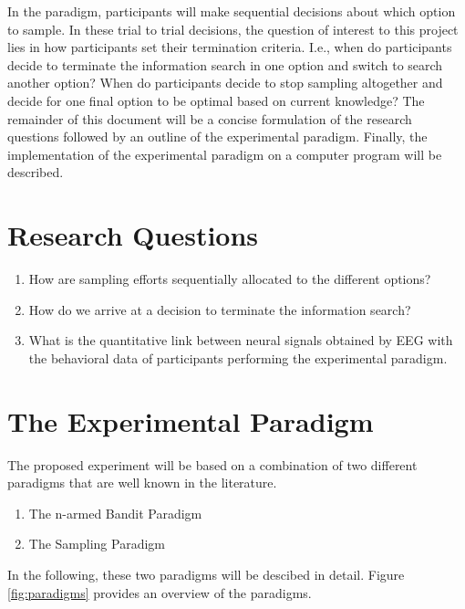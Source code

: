 \documentclass[
	12pt,
	oneside,
	bibliography=totocnumbered]{scrartcl}
\begin{document}
In the paradigm, participants will make sequential decisions about which option to sample. In these trial to trial decisions, the question of interest to this project lies in how participants set their termination criteria. I.e., when do participants decide to terminate the information search in one option and switch to search another option? When do participants decide to stop sampling altogether and decide for one final option to be optimal based on current knowledge? The remainder of this document will be a concise formulation of the research questions followed by an outline of the experimental paradigm. Finally, the implementation of the experimental paradigm on a computer program will be described.


\section{Research Questions}

\begin{enumerate}
\item How are sampling efforts sequentially allocated to the different options?
\item How do we arrive at a decision to terminate the information search?
\item What is the quantitative link between neural signals obtained by EEG with the behavioral data of participants performing the experimental paradigm.
\end{enumerate}



\section{The Experimental Paradigm}
The proposed experiment will be based on a combination  of two different paradigms that are well known in the literature.

\begin{enumerate}
\item The n-armed Bandit Paradigm
\item The Sampling Paradigm
\end{enumerate}

In the following, these two paradigms will be descibed in detail. Figure \ref{fig:paradigms} provides an overview of the paradigms.


\end{document}
